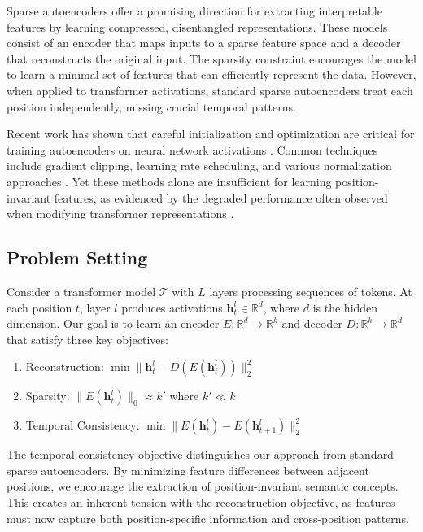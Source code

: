 \documentclass{article} %
\begin{document}
Sparse autoencoders \cite{goodfellow2016deep} offer a promising direction for extracting interpretable features by learning compressed, disentangled representations. These models consist of an encoder that maps inputs to a sparse feature space and a decoder that reconstructs the original input. The sparsity constraint encourages the model to learn a minimal set of features that can efficiently represent the data. However, when applied to transformer activations, standard sparse autoencoders treat each position independently, missing crucial temporal patterns.

Recent work has shown that careful initialization and optimization are critical for training autoencoders on neural network activations \cite{kingma2014adam}. Common techniques include gradient clipping, learning rate scheduling, and various normalization approaches \cite{ba2016layer}. Yet these methods alone are insufficient for learning position-invariant features, as evidenced by the degraded performance often observed when modifying transformer representations \cite{loshchilov2017adamw}.

\subsection{Problem Setting}
Consider a transformer model $\mathcal{T}$ with $L$ layers processing sequences of tokens. At each position $t$, layer $l$ produces activations $\mathbf{h}_t^l \in \mathbb{R}^d$, where $d$ is the hidden dimension. Our goal is to learn an encoder $E: \mathbb{R}^d \rightarrow \mathbb{R}^k$ and decoder $D: \mathbb{R}^k \rightarrow \mathbb{R}^d$ that satisfy three key objectives:

\begin{enumerate}
    \item Reconstruction: $\min \|\mathbf{h}_t^l - D(E(\mathbf{h}_t^l))\|_2^2$
    \item Sparsity: $\|E(\mathbf{h}_t^l)\|_0 \approx k'$ where $k' \ll k$
    \item Temporal Consistency: $\min \|E(\mathbf{h}_t^l) - E(\mathbf{h}_{t+1}^l)\|_2^2$
\end{enumerate}

The temporal consistency objective distinguishes our approach from standard sparse autoencoders. By minimizing feature differences between adjacent positions, we encourage the extraction of position-invariant semantic concepts. This creates an inherent tension with the reconstruction objective, as features must now capture both position-specific information and cross-position patterns.
\end{document}
